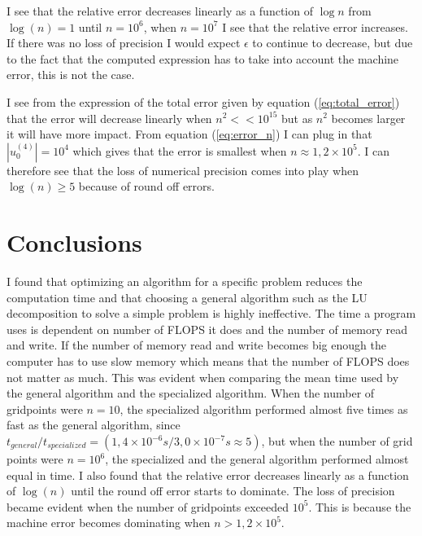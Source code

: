 \documentclass[12pt]{article}
\begin{document}
I see that the relative error decreases linearly as a function of $\log{n}$  from $\log{(n)}=1 $ until $n=10^6$, when $n=10^7$ I see that the relative error increases. If there was no loss of precision I would expect $\epsilon$ to continue to decrease, but due to the fact that the computed expression has to take into account the machine error, this is not the case. 
\hfill\break

I see from the expression of the total error given by equation (\ref{eq:total_error}) that the error will decrease linearly when $n^2<<10^{15}$ but as $n^2$ becomes larger it will have more impact. From equation (\ref{eq:error_n}) I can plug in that $|u^{(4)}_0|=10^4$ which gives that the error is smallest when $n\approx1,2\times 10^{5}$. I can therefore see that the loss of numerical precision comes into play when $\log{(n)}\geq 5$ because of round off errors.

\section{Conclusions}
I found that optimizing an algorithm for a specific problem reduces the computation time and that choosing a general algorithm such as the LU decomposition to solve a simple problem is highly ineffective. The time a program uses is dependent on number of FLOPS it does and the number of memory read and write. If the number of memory read and write becomes big enough the computer has to use slow memory which means that the number of FLOPS does not matter as much. This was evident when comparing the mean time used by the general algorithm and the specialized algorithm. When the number of gridpoints were $n=10$, the specialized algorithm performed almost five times as fast as the general algorithm, since $t_{general}/t_{specialized}=(1,4\times 10^{-6}s/3,0\times10^{-7}s\approx 5)$, but when the number of grid points were $n=10^6$, the specialized and the general algorithm performed almost equal in time. I also found that the relative error decreases linearly as a function of $\log{(n)}$ until the round off error starts to dominate. The loss of precision became evident when the number of gridpoints exceeded $10^5$. This is because the machine error becomes dominating when $n> 1,2\times 10^{5}$. 

\printbibliography
\end{document}
